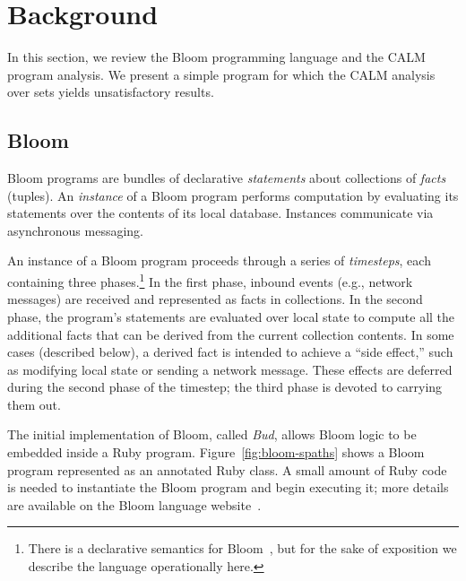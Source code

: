 \section{Background}
\label{sec:background}

In this section, we review the Bloom programming language and the CALM program
analysis.  We present a simple program for which the CALM analysis over sets
yields unsatisfactory results.

\subsection{Bloom}
\label{sec:bg-bloom}

Bloom programs are bundles of declarative \emph{statements} about collections of
\emph{facts} (tuples). An \emph{instance} of a Bloom program performs
computation by evaluating its statements over the contents of its local
database. Instances communicate via asynchronous messaging.

An instance of a Bloom program proceeds through a series of \emph{timesteps},
each containing three phases.\footnote{There is a declarative semantics for
  Bloom~\cite{dedalus-semantics,dedalus}, but for the sake of exposition we
  describe the language operationally here.} In the first phase, inbound events
(e.g., network messages) are received and represented as facts in
collections. In the second phase, the program's statements are evaluated over
local state to compute all the additional facts that can be derived from the
current collection contents. In some cases (described below), a derived fact is
intended to achieve a ``side effect,'' such as modifying local state or sending
a network message.  These effects are deferred during the second phase of the
timestep; the third phase is devoted to carrying them out.

The initial implementation of Bloom, called \emph{Bud}, allows Bloom logic to be
embedded inside a Ruby program. Figure~\ref{fig:bloom-spaths} shows a Bloom
program represented as an annotated Ruby class. A small amount of Ruby code is
needed to instantiate the Bloom program and begin executing it; more details are
available on the Bloom language website~\cite{bloom}.

